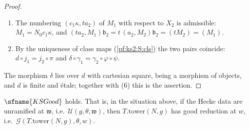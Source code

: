 \begin{proof}
\begin{enumerate}
  (: a Hecke isogeny for $h$ from level $N'u$ to level
  $N'u'$ carries $\eta(uy)$ to $\eta(u'y')$ whenever $h\cdot y\equiv y'\bmod N'\kstwoLaHat$); and
  $\gamma_2\circ\varphi$ carries these to the level-$N_0$ structure of $\mathcal B_2$ and to
  $\lambda_2(y)$.
\item The numbering $(c_1\kappa,ta_2)$ of $M_1$ with respect to $X_2$ is admissible:
  $M_1=N_0c_1\kappa$, and $(ta_2,M_1)\mathfrak b_2=t\,(a_2,M_2)\mathfrak b_2=(tM_2)=(M_1)$.
\item By the uniqueness of class maps (\ref{pf:ks2:S:cls}) the two pairs coincide: $d\circ
  j_1=j_2\circ\pi$ and $\delta\circ\gamma_1=\gamma_2\circ\varphi\circ\psi$.
\end{enumerate}
The morphism $\delta$ lies over $d$ with cartesian square, being a morphism of objects, and $d$ is
finite and \'etale; together with (6) this is the assertion.
\end{proof}

\begin{theorem}\label{pf:ks2:ksgood}
$\sfname{KSGood}$ holds. That is, in the situation above, if the Hecke data are unramified at
$\mathfrak w$, i.e.\ $\mathcal{U}(g,\theta,\mathfrak w)$, then $T.\mathrm{tower}(N,g)$ has good
reduction at $w$, i.e.\ $\mathcal{G}(T.\mathrm{tower}(N,g),\theta,w)$.
\end{theorem}

